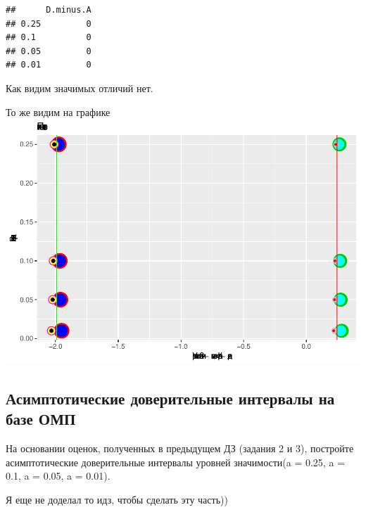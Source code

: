 \documentclass[]{article}
\begin{document}
\begin{verbatim}
##      D.minus.A
## 0.25         0
## 0.1          0
## 0.05         0
## 0.01         0
\end{verbatim}

Как видим значимых отличий нет.

То же видим на графике
\includegraphics{README_figs/README-unnamed-chunk-10-1.pdf}

\subsection{Асимптотические доверительные интервалы на базе
ОМП}\label{-----}

На основании оценок, полученных в предыдущем ДЗ (задания 2 и 3),
постройте асимптотические доверительные интервалы уровней значимости(a =
0.25, a = 0.1, a = 0.05, a = 0.01).

Я еще не доделал то идз, чтобы сделать эту часть))
\end{document}
